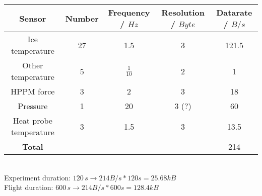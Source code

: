 \documentclass[12pt, a4paper]{scrreprt}
\begin{document}
\begin{tabular}{|c|c|c|c|c|}
	\hline 
	Sensor & Number & Frequency / $Hz$ & Resolution / $Byte$ & Datarate / $B/s$ \\ 
	\hline 
	Ice temperature & 27 & 1.5 & 3 & 121.5 \\ 
	\hline 
	Other temperature & 5 & $\frac{1}{10}$ & 2 & 1 \\ 
	\hline 
	HPPM force & 3 & 2 & 3 & 18 \\ 
	\hline 
	Pressure & 1 & 20 & 3 (?) & 60 \\ 
	\hline 
	Heat probe temperature & 3 & 1.5 & 3 & 13.5 \\ 
	\hline 
	\textbf{Total} & & & & 214 \\ 
	\hline 
\end{tabular} 
\\[0.5em]
Experiment duration: $120\,s \rightarrow 214B/s * 120s = 25.68kB$
\\[0.5em]
Flight duration: $600\,s \rightarrow 214B/s * 600s = 128.4kB$
\end{document}
